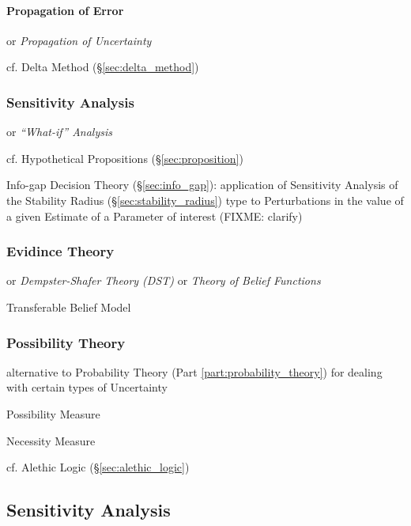 \paragraph{Propagation of Error}\label{sec:error_propagation}\hfill

or \emph{Propagation of Uncertainty}

\fist cf. Delta Method (\S\ref{sec:delta_method})



\subsubsection{Sensitivity Analysis}\label{sec:sensitivity_analysis}

or \emph{``What-if'' Analysis}

cf. Hypothetical Propositions (\S\ref{sec:proposition})

\fist Info-gap Decision Theory (\S\ref{sec:info_gap}): application of
Sensitivity Analysis of the Stability Radius (\S\ref{sec:stability_radius}) type
to Perturbations in the value of a given Estimate of a Parameter of interest
(FIXME: clarify)



\subsubsection{Evidince Theory}\label{sec:evidence_theory}

or \emph{Dempster-Shafer Theory (DST)} or \emph{Theory of Belief Functions}

Transferable Belief Model



\subsubsection{Possibility Theory}\label{sec:possibility_theory}

alternative to Probability Theory (Part \ref{part:probability_theory}) for
dealing with certain types of Uncertainty

Possibility Measure

Necessity Measure

cf. Alethic Logic (\S\ref{sec:alethic_logic})



\subsection{Sensitivity Analysis}\label{sec:sensitivity_analysis}

